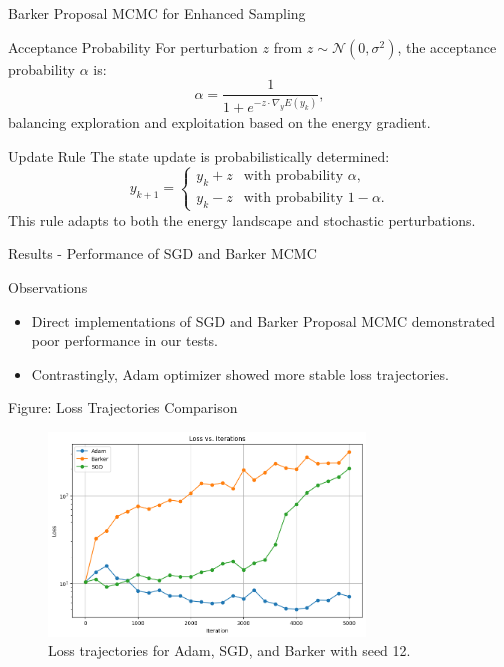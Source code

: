 \documentclass{beamer}
\begin{document}
\begin{frame}{Barker Proposal MCMC for Enhanced Sampling}
    \begin{block}{Acceptance Probability}
        For perturbation \(z\) from \(z \sim \mathcal{N}(0, \sigma^2)\), the acceptance probability \(\alpha\) is:
        \begin{equation}
            \alpha = \frac{1}{1+e^{-z \cdot \nabla_{y} E(y_k)}},
        \end{equation}
        balancing exploration and exploitation based on the energy gradient.
    \end{block}

    \begin{block}{Update Rule}
        The state update is probabilistically determined:
        \begin{equation}
            y_{k+1} =
            \begin{cases}
                y_k + z & \text{with probability } \alpha,   \\
                y_k - z & \text{with probability } 1-\alpha.
            \end{cases}
        \end{equation}
        This rule adapts to both the energy landscape and stochastic perturbations.
    \end{block}
\end{frame}

\begin{frame}{Results - Performance of SGD and Barker MCMC}
    \begin{block}{Observations}
        \begin{itemize}
            \item Direct implementations of SGD and Barker Proposal MCMC demonstrated poor performance in our tests.
            \item Contrastingly, Adam optimizer showed more stable loss trajectories.
        \end{itemize}
    \end{block}

    \begin{block}{Figure: Loss Trajectories Comparison}
        \begin{figure}
            \centering
            \includegraphics[width=0.75\textwidth]{seed12.png}
            \caption{Loss trajectories for Adam, SGD, and Barker with seed 12.}
        \end{figure}
    \end{block}
\end{frame}
\end{document}
